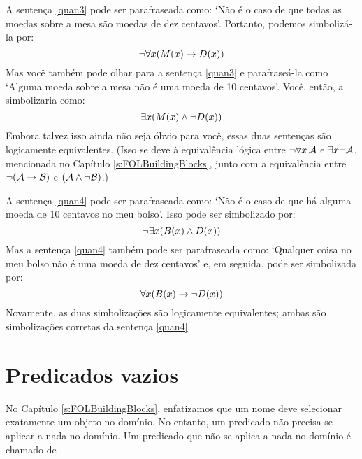 A sentença \ref{quan3} pode ser parafraseada como:
`Não é o caso de que todas as moedas sobre a mesa são moedas de dez centavos'.
Portanto, podemos simbolizá-la por:
$$\neg \forall x(\mathord{M}(x) \rightarrow \mathord{D}(x))$$
Mas você também pode olhar para a sentença \ref{quan3} e parafraseá-la como `Alguma moeda sobre a mesa não é uma moeda de 10 centavos'.
Você, então, a simbolizaria como:
$$\exists x(\mathord{M}(x) \wedge \neg \mathord{D}(x))$$
Embora talvez isso ainda não seja óbvio para você, essas duas sentenças são logicamente equivalentes.
(Isso se deve à equivalência lógica entre $\neg\forall x\,\mathcal{A}$ e $\exists x\neg\mathcal{A}$, mencionada no Capítulo \ref{s:FOLBuildingBlocks}, junto com a equivalência entre $\neg(\mathcal{A}\rightarrow\mathcal{B})$ e $(\mathcal{A}\wedge\neg\mathcal{B})$.)

A sentença \ref{quan4} pode ser parafraseada como:
`Não é o caso de que há alguma moeda de 10 centavos no meu bolso'.
Isso pode ser simbolizado por:
$$\neg\exists x(\mathord{B}(x) \wedge \mathord{D}(x))$$
Mas a sentença \ref{quan4} também pode ser parafraseada  como:
`Qualquer coisa no meu bolso não é uma moeda de dez centavos' e, em seguida, pode ser simbolizada por:
$$\forall x(\mathord{B}(x) \rightarrow \neg \mathord{D}(x))$$
Novamente, as duas simbolizações são logicamente equivalentes; ambas são simbolizações corretas da sentença \ref{quan4}.


\section{Predicados vazios}\label{s:PredVaz}

No Capítulo \ref{s:FOLBuildingBlocks}, enfatizamos que um nome deve selecionar exatamente um objeto no domínio.
No entanto, um predicado não precisa se aplicar a nada no domínio.
Um predicado que não se aplica a nada no domínio é chamado de .

